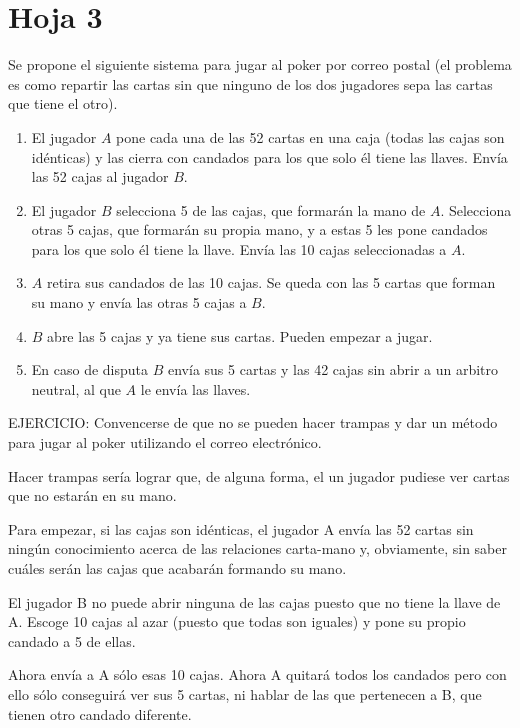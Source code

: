 \section{Hoja 3}
\begin{problem}[1]
Se propone el siguiente sistema para jugar al poker por correo postal (el
problema es como repartir las cartas sin que ninguno de los dos jugadores sepa
las cartas que tiene el otro).

\begin{enumerate}
\item El jugador $A$ pone cada una de las 52 cartas en una caja
(todas las cajas son idénticas) y las cierra con candados para los
que solo él tiene las llaves. Envía las 52 cajas al jugador $B$.

\item El jugador $B$ selecciona 5 de las cajas, que formarán la mano
de $A$. Selecciona otras 5 cajas, que formarán su propia mano, y a
estas 5 les pone candados para los que solo él tiene la llave.
Envía las 10 cajas seleccionadas a $A$.

\item $A$ retira sus candados de las 10 cajas. Se queda con las 5
cartas que forman su mano y envía las otras 5 cajas a $B$.

\item $B$ abre las 5 cajas y ya tiene sus cartas. Pueden empezar a jugar.

\item En caso de disputa $B$ envía sus 5 cartas y las 42 cajas sin
abrir a un arbitro neutral, al que $A$ le envía las llaves.
\end{enumerate}

EJERCICIO: Convencerse de que no se pueden hacer trampas y dar un
método para jugar al poker utilizando el correo electrónico.
\solution


Hacer trampas sería lograr que, de alguna forma, el un jugador pudiese ver cartas que no estarán en su mano.

Para empezar, si las cajas son idénticas, el jugador A envía las 52 cartas sin ningún conocimiento acerca de las relaciones carta-mano y, obviamente, sin saber cuáles serán las cajas que acabarán formando su mano.

El jugador B no puede abrir ninguna de las cajas puesto que no tiene la llave de A. Escoge 10 cajas al azar (puesto que todas son iguales) y pone su propio candado a 5 de ellas.

Ahora envía a A sólo esas 10 cajas. Ahora A quitará todos los candados pero con ello sólo conseguirá ver sus 5 cartas, ni hablar de las que pertenecen a B, que tienen otro candado diferente.


\end{problem}
